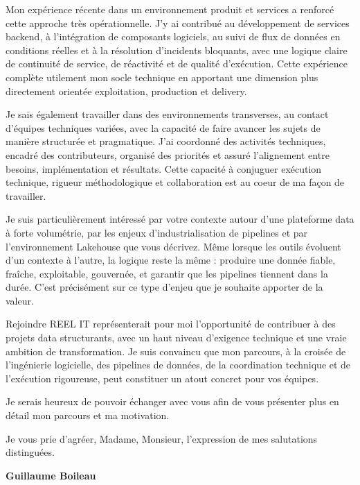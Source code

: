 \documentclass[11pt,a4paper]{altacv}
\begin{document}
{Mon expérience récente dans un environnement produit et services a renforcé cette approche très opérationnelle. J’y ai contribué au développement de services backend, à l’intégration de composants logiciels, au suivi de flux de données en conditions réelles et à la résolution d’incidents bloquants, avec une logique claire de continuité de service, de réactivité et de qualité d’exécution. Cette expérience complète utilement mon socle technique en apportant une dimension plus directement orientée exploitation, production et delivery.

Je sais également travailler dans des environnements transverses, au contact d’équipes techniques variées, avec la capacité de faire avancer les sujets de manière structurée et pragmatique. J’ai coordonné des activités techniques, encadré des contributeurs, organisé des priorités et assuré l’alignement entre besoins, implémentation et résultats. Cette capacité à conjuguer exécution technique, rigueur méthodologique et collaboration est au coeur de ma façon de travailler.

Je suis particulièrement intéressé par votre contexte autour d’une plateforme data à forte volumétrie, par les enjeux d’industrialisation de pipelines et par l’environnement Lakehouse que vous décrivez. Même lorsque les outils évoluent d’un contexte à l’autre, la logique reste la même : produire une donnée fiable, fraîche, exploitable, gouvernée, et garantir que les pipelines tiennent dans la durée. C’est précisément sur ce type d’enjeu que je souhaite apporter de la valeur.

Rejoindre REEL IT représenterait pour moi l’opportunité de contribuer à des projets data structurants, avec un haut niveau d’exigence technique et une vraie ambition de transformation. Je suis convaincu que mon parcours, à la croisée de l’ingénierie logicielle, des pipelines de données, de la coordination technique et de l’exécution rigoureuse, peut constituer un atout concret pour vos équipes.

Je serais heureux de pouvoir échanger avec vous afin de vous présenter plus en détail mon parcours et ma motivation.

Je vous prie d’agréer, Madame, Monsieur, l’expression de mes salutations distinguées.

\textbf{Guillaume Boileau}

}
\end{document}
